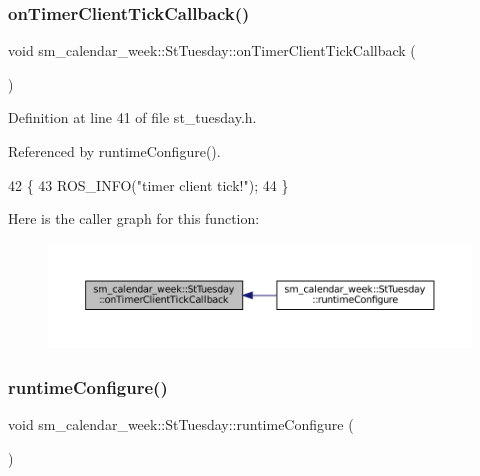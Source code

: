 \subsubsection{\texorpdfstring{on\+Timer\+Client\+Tick\+Callback()}{onTimerClientTickCallback()}}
{\footnotesize\ttfamily void sm\+\_\+calendar\+\_\+week\+::\+St\+Tuesday\+::on\+Timer\+Client\+Tick\+Callback (\begin{DoxyParamCaption}{ }\end{DoxyParamCaption})\hspace{0.3cm}{\ttfamily [inline]}}



Definition at line 41 of file st\+\_\+tuesday.\+h.



Referenced by runtime\+Configure().


\begin{DoxyCode}
42     \{
43         ROS\_INFO(\textcolor{stringliteral}{"timer client tick!"});
44     \}
\end{DoxyCode}
Here is the caller graph for this function\+:
\nopagebreak
\begin{figure}[H]
\begin{center}
\leavevmode
\includegraphics[width=350pt]{structsm__calendar__week_1_1StTuesday_a7d8597c9f4fae517b37147b90c49fb3c_icgraph}
\end{center}
\end{figure}
\mbox{\label{structsm__calendar__week_1_1StTuesday_a1980a60ba5b27efea0cca5746694985f}} 
\subsubsection{\texorpdfstring{runtime\+Configure()}{runtimeConfigure()}}
{\footnotesize\ttfamily void sm\+\_\+calendar\+\_\+week\+::\+St\+Tuesday\+::runtime\+Configure (\begin{DoxyParamCaption}{ }\end{DoxyParamCaption})\hspace{0.3cm}{\ttfamily [inline]}}



